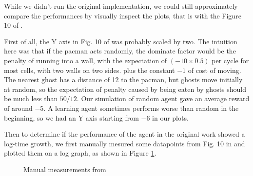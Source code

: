 \documentclass{article}
\begin{document}
\begin{flushleft}
\begin{figure}
\end{figure}




While we didn't run the original implementation, we could still
approximately compare the performances by visually inspect the 
plots, that is with the Figure 10 of \cite{orig}.

First of all, the Y axis in Fig. 10 of \cite{orig} was probably scaled by two.
The intuition here was that if the pacman acts randomly,
the dominate factor would be the penalty of running into a wall,
with the expectation of $(-10 \times 0.5)$ per cycle for most cells,
with two walls on two sides.
plus the constant $-1$ of cost of moving.
The nearest ghost has a distance of 12 to the pacman,
but ghosts move initially at random, so the expectation
of penalty caused by being eaten by ghosts should be
much less than $50/12$. Our simulation of random agent
gave an average reward of around $-5$.
A learning agent sometimes performs worse than random
in the beginning,
so we had an Y axis starting from $-6$ in our plots.

Then to determine if the performance of the agent in the original work showed
a log-time growth, we first manually mesured some datapoints from Fig. 10
in \cite{orig}
and plotted them on a log graph, as shown in Figure \ref{fig:jvm}.

\begin{figure}
\center
{}
\caption{\label{fig:jvm}Manual measurements from \cite{orig}}
\end{figure}


\end{flushleft}
\end{document}
